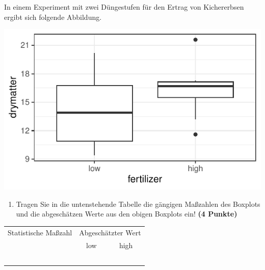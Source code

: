\documentclass[a4paper, 10pt]{scrartcl}\usepackage[]{graphicx}\usepackage[]{xcolor}
\makeatletter
\def\maxwidth{ %
  \ifdim\Gin@nat@width>\linewidth
    \linewidth
  \else
    \Gin@nat@width
  \fi
}
\makeatother
\begin{document}
In einem Experiment mit zwei D{\"u}ngestufen f{\"u}r den Ertrag von Kichererbsen
ergibt sich folgende Abbildung. 





{\centering \includegraphics[width=\maxwidth]{img/boxplot-4b-1} 

}




\begin{enumerate}
\item Tragen Sie in die untenstehende Tabelle die g{\"a}ngigen Ma{\ss}zahlen des
  Boxplots und die abgesch{\"a}tzen Werte aus den obigen Boxplots ein! \textbf{(4 Punkte)}
\end{enumerate}

\begin{center}
  \large
  \begin{tabular}[c]{c|c|c}
    Statistische Ma{\ss}zahl  & \multicolumn{2}{c}{Abgesch{\"a}tzter Wert}  \strut\\
    & low & high \\
    \hline
    \hspace{2cm} & \hspace{2cm} & \hspace{2cm} \strut\\
    \hline
    \hspace{2cm} & \hspace{2cm} & \hspace{2cm} \strut\\
    \hline
    \hspace{2cm} & \hspace{2cm} & \hspace{2cm} \strut\\
    \hline
    \hspace{2cm} & \hspace{2cm} & \hspace{2cm} \strut\\
    \hline
    \hspace{2cm} & \hspace{2cm} & \hspace{2cm} \strut\\
    \hline
  \end{tabular}
\end{center}
\end{document}
